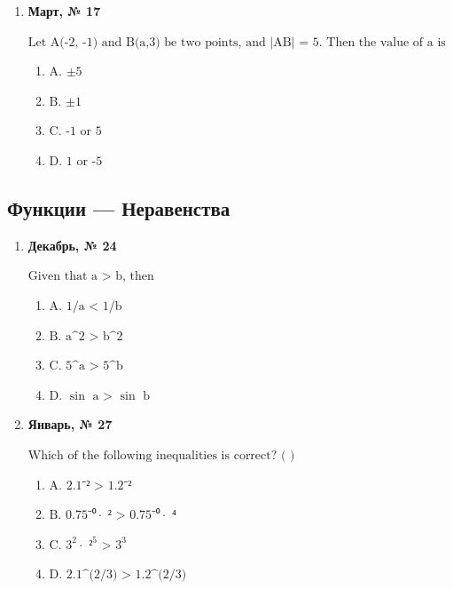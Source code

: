 \begin{enumerate}
\begin{enumerate}
\item $\displaystyle \text{C. }\sqrt{13}$
\item $\displaystyle \text{D. 5}$
\end{enumerate}
\item \textbf{Март, № 17} \par \smallskip
$\displaystyle \text{Let A(-2, -1) and B(a,3) be two points, and |AB| = 5. Then the value of a is}$
\begin{enumerate}
\item $\displaystyle \text{A. ±5}$
\item $\displaystyle \text{B. ±1}$
\item $\displaystyle \text{C. -1 or 5}$
\item $\displaystyle \text{D. 1 or -5}$
\end{enumerate}
\end{enumerate}

\subsection*{Функции — Неравенства}
\begin{enumerate}
\item \textbf{Декабрь, № 24} \par \smallskip
$\displaystyle \text{Given that a > b, then}$
\begin{enumerate}
\item $\displaystyle \text{A. 1/a < 1/b}$
\item $\displaystyle \text{B. a^2 > b^2}$
\item $\displaystyle \text{C. 5^a > 5^b}$
\item $\displaystyle \text{D. }\sin\text{ a > }\sin\text{ b}$
\end{enumerate}
\item \textbf{Январь, № 27} \par \smallskip
$\displaystyle \text{Which of the following inequalities is correct? ( )}$
\begin{enumerate}
\item $\displaystyle \text{A. 2.1⁻² > 1.2⁻²}$
\item $\displaystyle \text{B. 0.75⁻⁰}\cdot\text{ ² > 0.75⁻⁰}\cdot\text{ ⁴}$
\item $\displaystyle \text{C. 3}^{2}\cdot\text{ ²}^{5}\text{ > 3}^{3}$
\item $\displaystyle \text{D. 2.1^(2/3) > 1.2^(2/3)}$
\end{enumerate}
\end{enumerate}

